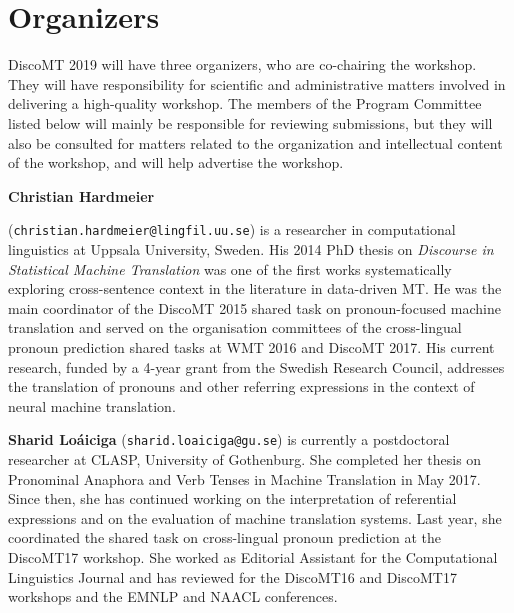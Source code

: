 \documentclass[11pt]{article}
\begin{document}


\section{Organizers}

DiscoMT 2019 will have three organizers, who are co-chairing the workshop.  They will have responsibility for scientific and administrative matters involved in delivering a high-quality workshop.  The members of the Program Committee listed below will mainly be responsible for reviewing submissions, but they will also be consulted for matters related to the organization and intellectual content of the workshop, and will help advertise the workshop.


\textbf{Christian Hardmeier}

(\texttt{christian.hardmeier@lingfil.uu.se}) is a
researcher in computational linguistics at Uppsala University, Sweden. His 2014
PhD thesis on \emph{Discourse in Statistical Machine Translation} was one
of the first works systematically exploring cross-sentence context in the
literature in data-driven MT. He was the main coordinator of the DiscoMT 2015
shared task on pronoun-focused machine translation and served on the
organisation committees of the cross-lingual pronoun prediction shared
tasks at WMT 2016 and DiscoMT 2017. His current research, funded by a
4-year grant from the Swedish Research Council, addresses the translation
of pronouns and other referring expressions in the context of neural
machine translation.


\textbf{Sharid Loáiciga} (\texttt{sharid.loaiciga@gu.se}) is currently a postdoctoral researcher at CLASP, University of Gothenburg. She completed her thesis on Pronominal Anaphora and Verb Tenses in Machine Translation in May 2017. Since then, she has continued working on the interpretation of referential expressions and on the evaluation of machine translation systems. Last year, she coordinated the shared task on cross-lingual pronoun prediction at the DiscoMT17 workshop. She worked as Editorial Assistant for the Computational Linguistics Journal  and has reviewed for the DiscoMT16 and DiscoMT17 workshops and the EMNLP and NAACL conferences. 
\end{document}
